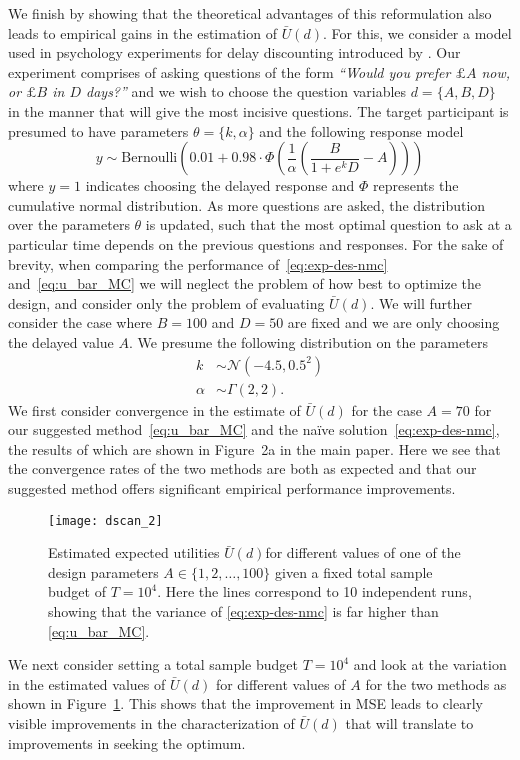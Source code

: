 We finish by showing that the theoretical advantages of this reformulation also leads to empirical gains in the estimation of $\bar{U}(d)$.  For this, we consider a model used in psychology experiments for delay discounting introduced by \cite{vincent2016hierarchical}.  Our experiment comprises of asking questions of the form \emph{``Would you prefer $\pounds A$ now, or $\pounds B$ in $D$ days?''} and we wish to choose the question  variables $d = \{A,B,D\}$ in the manner that will give the most incisive questions.  The target participant is presumed to have parameters $\theta=\{k,\alpha\}$ and the following response model
\begin{equation}
y \sim \mathrm{Bernoulli} \left(0.01 + 0.98 \cdot \Phi\left(\frac{1}{\alpha} \left(\frac{B}{1+e^k D}-A\right)\right)\right)
\end{equation}
where $y=1$ indicates choosing the delayed response and $\Phi$ represents the cumulative normal distribution.  As more questions are asked, the distribution over the parameters $\theta$ is updated, such
that the most optimal question to ask at a particular time depends on the previous questions
and responses.  For the sake of brevity, when comparing the performance of~\eqref{eq:exp-des-nmc} and~\eqref{eq:u_bar_MC} we will neglect the problem of how best to optimize the design, and consider
only the problem of evaluating $\bar{U}(d)$.  We will further consider the case where $B=100$ and $D = 50$ are fixed and we are only choosing the delayed value $A$.
We presume the following distribution on the parameters
\begin{align*}
k &\sim \mathcal{N}(-4.5,0.5^2) \\
\alpha &\sim \Gamma(2,2).
\end{align*}
We first consider convergence in the estimate of $\bar{U}(d)$ for the case $A=70$ for our suggested method~\eqref{eq:u_bar_MC} and the na\"{i}ve solution~\eqref{eq:exp-des-nmc}, the results of which are shown in Figure~2a in the main paper. 
Here we see that the convergence rates of the two methods are both as expected and that our suggested method offers significant empirical performance improvements.  

\begin{figure}[t]
		\centering
		\texttt{[image: dscan\_2]}
		\caption{Estimated expected utilities $\bar{U}(d)$for 
		different values of one of the design parameters $A \in \{1,2,\dots,100\}$ given a fixed total
		sample budget of $T=10^4$.  Here the lines correspond to 10 independent runs, showing
		that the variance of \eqref{eq:exp-des-nmc} is far higher than \eqref{eq:u_bar_MC}.\label{fig:exp-d-scan}}
\end{figure}


We next consider setting a total sample budget $T=10^4$ and look at the variation in the estimated values of $\bar{U}(d)$ for different values of $A$ for the two methods as shown in Figure~\ref{fig:exp-d-scan}.
This shows that the improvement in MSE leads to clearly visible improvements in the characterization of $\bar{U}(d)$ that
will translate to improvements in seeking the optimum.
